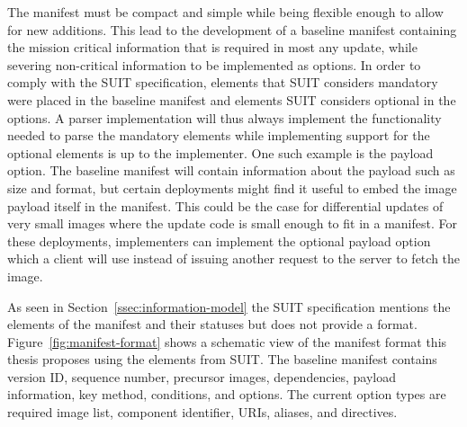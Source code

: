\documentclass[0-thesis.tex]{subfiles}
\begin{document}
The manifest must be compact and simple while being flexible enough to allow for new
additions. This lead to the development of a baseline manifest containing the mission
critical information that is required in most any update, while severing non-critical
information to be implemented as options. In order to comply with the SUIT specification,
elements that SUIT considers mandatory were placed in the baseline manifest and elements
SUIT considers optional in the options. A parser implementation will thus always implement
the functionality needed to parse the mandatory elements while implementing support for
the optional elements is up to the implementer. One such example is the payload option.
The baseline manifest will contain information about the payload such as size and format,
but certain deployments might find it useful to embed the image payload itself in the
manifest. This could be the case for differential updates of very small images where the
update code is small enough to fit in a manifest. For these deployments, implementers can
implement the optional payload option which a client will use instead of issuing another
request to the server to fetch the image.

As seen in Section~\ref{ssec:information-model} the SUIT specification mentions the
elements of the manifest and their statuses but does not provide a format.
Figure~\ref{fig:manifest-format} shows a schematic view of the manifest format this thesis
proposes using the elements from SUIT. The baseline manifest contains version ID, sequence
number, precursor images, dependencies, payload information, key method, conditions, and
options. The current option types are required image list, component identifier, URIs,
aliases, and directives.
\end{document}
